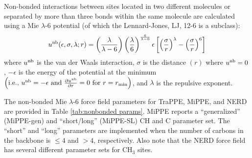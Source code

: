 \documentclass[journal=jced,manuscript=article]{achemso}
\begin{document}
    Non-bonded interactions between sites located in two different molecules or separated by more than three bonds within the same molecule are calculated using a Mie $\lambda$-6 potential (of which the Lennard-Jones, LJ, 12-6 is a subclass):
    \begin{equation} \label{eq:Mie}
    u^{\rm nb}(\epsilon,\sigma,\lambda;r) = \left(\frac{\lambda}{\lambda - 6}\right)\left(\frac{\lambda}{6}\right)^{\frac{6}{\lambda - 6}} \epsilon \left[\left(\frac{\sigma}{r}\right)^{\lambda} - \left(\frac{\sigma}{r}\right)^6\right]
    \end{equation} 
    where $u^{\rm nb}$ is the van der Waals interaction, $\sigma$ is the distance $(r)$ where $u^{\rm nb} = 0$, $-\epsilon$ is the energy of the potential at the minimum $\left(\text{i.e., }u^{\rm nb} = -\epsilon \text{ and } \frac{\partial u^{\rm nb}}{\partial r} = 0 \text{ for } r=r_{\rm min} \right)$, and $\lambda$ is the repulsive exponent. 
    
    The non-bonded Mie $\lambda$-6 force field parameters for TraPPE, MiPPE, and NERD are provided in Table \ref{tab:nonbonded params}. MiPPE reports a ``generalized'' (MiPPE-gen) and ``short/long'' (MiPPE-SL) CH and C parameter set. The ``short'' and ``long'' parameters are implemented when the number of carbons in the backbone is $\le 4$ and $> 4$, respectively. Also note that the NERD force field has several different parameter sets for CH$_3$ sites.
    
\end{document}
